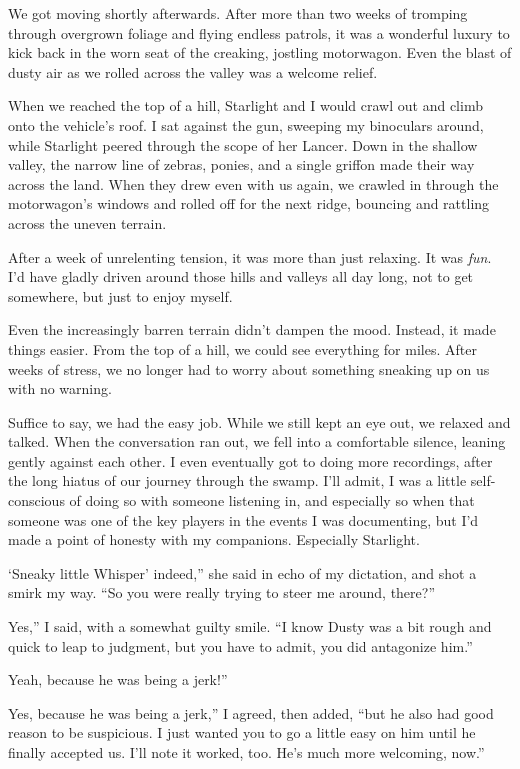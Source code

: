 We got moving shortly afterwards. After more than two weeks of tromping through overgrown foliage and flying endless patrols, it was a wonderful luxury to kick back in the worn seat of the creaking, jostling motorwagon. Even the blast of dusty air as we rolled across the valley was a welcome relief.

When we reached the top of a hill, Starlight and I would crawl out and climb onto the vehicle’s roof. I sat against the gun, sweeping my binoculars around, while Starlight peered through the scope of her Lancer. Down in the shallow valley, the narrow line of zebras, ponies, and a single griffon made their way across the land. When they drew even with us again, we crawled in through the motorwagon’s windows and rolled off for the next ridge, bouncing and rattling across the uneven terrain.

After a week of unrelenting tension, it was more than just relaxing. It was \textit{fun}. I’d have gladly driven around those hills and valleys all day long, not to get somewhere, but just to enjoy myself.

Even the increasingly barren terrain didn’t dampen the mood. Instead, it made things easier. From the top of a hill, we could see everything for miles. After weeks of stress, we no longer had to worry about something sneaking up on us with no warning.

Suffice to say, we had the easy job. While we still kept an eye out, we relaxed and talked. When the conversation ran out, we fell into a comfortable silence, leaning gently against each other. I even eventually got to doing more recordings, after the long hiatus of our journey through the swamp. I’ll admit, I was a little self-conscious of doing so with someone listening in, and especially so when that someone was one of the key players in the events I was documenting, but I’d made a point of honesty with my companions. Especially Starlight.

\leavevmode{}‘Sneaky little Whisper’ indeed,” she said in echo of my dictation, and shot a smirk my way. “So you were really trying to steer me around, there?”

\leavevmode{}Yes,” I said, with a somewhat guilty smile. “I know Dusty was a bit rough and quick to leap to judgment, but you have to admit, you did antagonize him.”

\leavevmode{}Yeah, because he was being a jerk!”

\leavevmode{}Yes, because he was being a jerk,” I agreed, then added, “but he also had good reason to be suspicious. I just wanted you to go a little easy on him until he finally accepted us. I’ll note it worked, too. He’s much more welcoming, now.”

